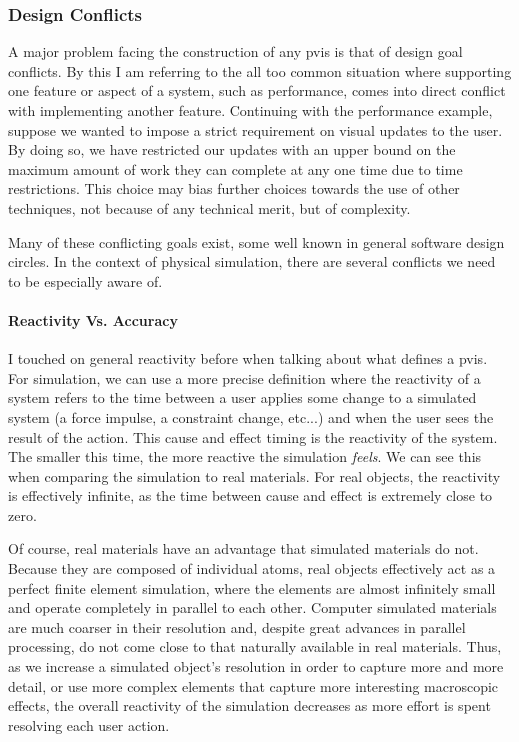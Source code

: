 \documentclass[12pt,oneside,letterpaper]{memoir}
\begin{document}
\subsubsection{Design Conflicts}

A major problem facing the construction of any \gls{pvis} is that of design
goal conflicts. By this I am referring to the all too common situation
where supporting one feature or aspect of a system, such as
performance, comes into direct conflict with implementing another
feature. Continuing with the performance example, suppose we wanted to
impose a strict requirement on visual updates to the user. By doing
so, we have restricted our updates with an upper bound on the maximum
amount of work they can complete at any one time due to time
restrictions. This choice may bias further choices towards the use of
other techniques, not because of any technical merit, but of
complexity.

Many of these conflicting goals exist, some well known in general
software design circles. In the context of physical simulation, there
are several conflicts we need to be especially aware of.


\paragraph{Reactivity Vs. Accuracy}
I touched on general reactivity before when talking about what defines
a \gls{pvis}. For simulation, we can use a more precise definition where the
reactivity of a system refers to the time between a user applies some
change to a simulated system (a force impulse, a constraint change,
etc...) and when the user sees the result of the action. This cause
and effect timing is the reactivity of the system. The smaller this
time, the more reactive the simulation \textit{feels}. We can see this
when comparing the simulation to real materials. For real objects, the
reactivity is effectively infinite, as the time between cause and
effect is extremely close to zero.

Of course, real materials have an advantage that simulated materials
do not. Because they are composed of individual atoms, real objects
effectively act as a perfect finite element simulation, where the
elements are almost infinitely small and operate completely in
parallel to each other. Computer simulated materials are much coarser
in their resolution and, despite great advances in parallel
processing, do not come close to that naturally available in real
materials. Thus, as we increase a simulated object's resolution in
order to capture more and more detail, or use more complex elements
that capture more interesting macroscopic effects, the overall
reactivity of the simulation decreases as more effort is spent
resolving each user action.
\end{document}
